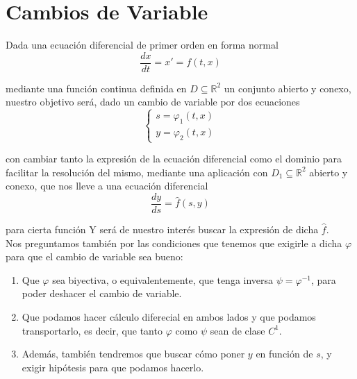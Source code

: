\newpage
\chapter{Cambios de Variable}
Dada una ecuación diferencial de primer orden en forma normal
\begin{equation*}
    \dfrac{dx}{dt} = x' = f(t,x)
\end{equation*}

mediante una función 
continua definida en $D\subseteq \mathbb{R}^2$ un conjunto abierto y conexo, nuestro objetivo será, dado un cambio de variable por dos ecuaciones
\begin{equation*}
    \left\{\begin{array}{rl}
        s=\varphi_1(t,x) \\
        y = \varphi_2(t,x)
    \end{array}\right.
\end{equation*}

con 
cambiar tanto la expresión de la ecuación diferencial como el dominio para facilitar la resolución del mismo, mediante una aplicación
con $D_1\subseteq \mathbb{R}^2$ abierto y conexo, que nos lleve a una ecuación diferencial
\begin{equation*}
    \dfrac{dy}{ds} = \hat{f} (s,y)
\end{equation*}

para cierta función
Y será de nuestro interés buscar la expresión de dicha $\hat{f}$.\\

Nos preguntamos también por las condiciones que tenemos que exigirle a dicha $\varphi$ para que el cambio de variable sea bueno:
\begin{enumerate}
    \item Que $\varphi$ sea biyectiva, o equivalentemente, que tenga inversa $\psi = \varphi^{-1}$, para poder deshacer el cambio de variable.
    \item Que podamos hacer cálculo diferecial en ambos lados y que podamos transportarlo, es decir, que tanto $\varphi$ como $\psi$ sean de clase $C^1$.
    \item Además, también tendremos que buscar cómo poner $y$ en función de $s$, y exigir hipótesis para que podamos hacerlo.
\end{enumerate}

